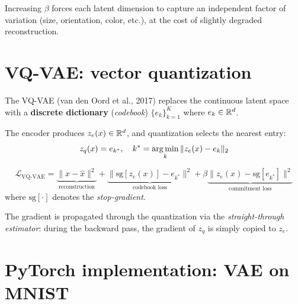 \begin{intuition}
Increasing $\beta$ forces each latent dimension to capture an independent factor of variation (size, orientation, color, etc.), at the cost of slightly degraded reconstruction.
\end{intuition}

\section{VQ-VAE: vector quantization}
\label{sec:vq-vae}

\begin{definition}
The VQ-VAE (van den Oord et al., 2017) replaces the continuous latent space with a \textbf{discrete dictionary} (\emph{codebook}) $\{e_k\}_{k=1}^K$ where $e_k \in \mathbb{R}^d$.

The encoder produces $z_e(x) \in \mathbb{R}^d$, and quantization selects the nearest entry:
\begin{equation}
z_q(x) = e_{k^*}, \quad k^* = \operatorname*{arg\,min}_k \|z_e(x) - e_k\|_2
\label{eq:vq}
\end{equation}
\end{definition}

\begin{keyformulas}[title=\textbf{VQ-VAE loss}]
\begin{equation}
\mathcal{L}_{\text{VQ-VAE}} = \underbrace{\|x - \hat{x}\|^2}_{\text{reconstruction}} + \underbrace{\|\text{sg}[z_e(x)] - e_{k^*}\|^2}_{\text{codebook loss}} + \beta \underbrace{\|z_e(x) - \text{sg}[e_{k^*}]\|^2}_{\text{commitment loss}}
\label{eq:vq-vae-loss}
\end{equation}
where $\text{sg}[\cdot]$ denotes the \emph{stop-gradient}.
\end{keyformulas}

\begin{remark}
The gradient is propagated through the quantization via the \emph{straight-through estimator}: during the backward pass, the gradient of $z_q$ is simply copied to $z_e$.
\end{remark}

\section{PyTorch implementation: VAE on MNIST}
\label{sec:vae-pytorch}


